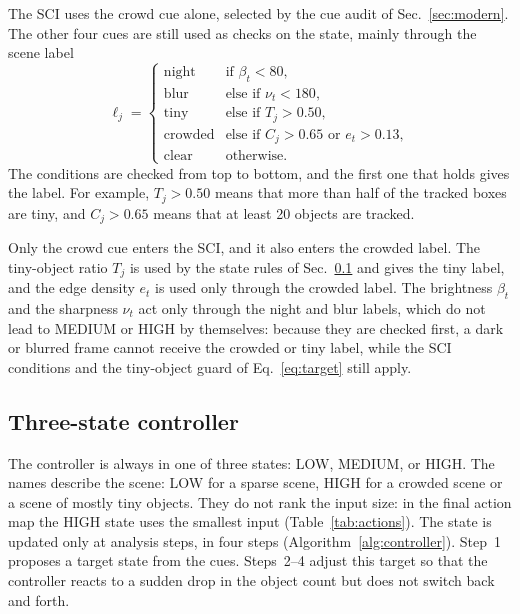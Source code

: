 \documentclass[journal]{new-aiaa}
\begin{document}
The SCI uses the crowd cue alone, selected by the cue audit of
Sec.~\ref{sec:modern}. The other four cues are still used as checks on the
state, mainly through the scene label
\begin{equation}
\ell_j=\begin{cases}
\text{night}   & \text{if } \beta_t<80,\\
\text{blur}    & \text{else if } \nu_t<180,\\
\text{tiny}    & \text{else if } T_j>0.50,\\
\text{crowded} & \text{else if } C_j>0.65 \text{ or } e_t>0.13,\\
\text{clear}   & \text{otherwise.}
\end{cases}
\label{eq:label}
\end{equation}
The conditions are checked from top to bottom, and the first one that holds
gives the label. For example, $T_j>0.50$ means that more than half of the
tracked boxes are tiny, and $C_j>0.65$ means that at least 20 objects are
tracked.

Only the crowd cue enters the SCI, and it also enters the crowded label. The
tiny-object ratio $T_j$ is used by the state rules of Sec.~\ref{sec:states}
and gives the tiny label, and the edge density $e_t$ is used only through the
crowded label. The brightness $\beta_t$ and the sharpness $\nu_t$ act only
through the night and blur labels, which do not lead to MEDIUM or HIGH by
themselves: because they are checked first, a dark or blurred frame cannot
receive the crowded or tiny label, while the SCI conditions and the
tiny-object guard of Eq.~\eqref{eq:target} still apply.

\subsection{Three-state controller}\label{sec:states}
The controller is always in one of three states: LOW, MEDIUM, or HIGH. The
names describe the scene: LOW for a sparse scene, HIGH for a crowded scene or
a scene of mostly tiny objects. They do not rank the input size: in the final
action map the HIGH state uses the smallest input (Table~\ref{tab:actions}).
The state is updated only at analysis steps, in four steps
(Algorithm~\ref{alg:controller}). Step~1 proposes a target state from the
cues. Steps~2--4 adjust this target so that the controller reacts to a sudden
drop in the object count but does not switch back and forth.
\end{document}
